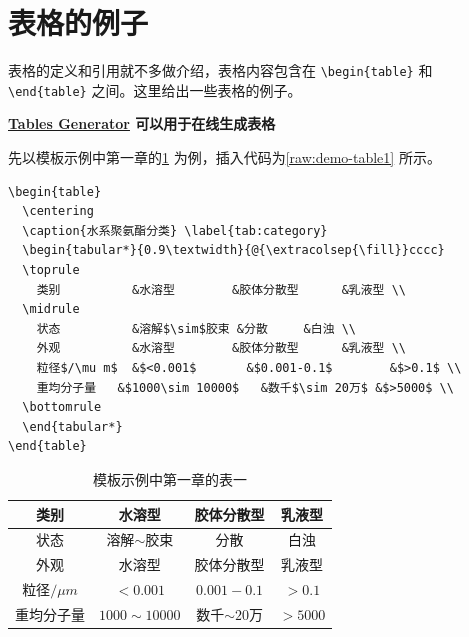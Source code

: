 \section{表格的例子}
\label{sec:tab}

表格的定义和引用就不多做介绍，表格内容包含在 \verb+\begin{table}+ 和 \verb+\end{table}+ 之间。这里给出一些表格的例子。

\textbf{\href{https://www.tablesgenerator.com/}{Tables Generator} 可以用于在线生成表格}

先以模板示例中第一章的\cref{tab:category} 为例，插入代码为\cref{raw:demo-table1} 所示。

\begin{lstlisting}[language={[LaTeX]TeX}, caption={示例插表代码}, label=raw:demo-table1]
\begin{table}
  \centering
  \caption{水系聚氨酯分类} \label{tab:category}
  \begin{tabular*}{0.9\textwidth}{@{\extracolsep{\fill}}cccc}
  \toprule
    类别			&水溶型		&胶体分散型		&乳液型 \\
  \midrule
    状态			&溶解$\sim$胶束	&分散		&白浊 \\
    外观			&水溶型		&胶体分散型		&乳液型 \\
    粒径$/\mu m$	&$<0.001$		&$0.001-0.1$		&$>0.1$ \\
    重均分子量	&$1000\sim 10000$	&数千$\sim 20万$ &$>5000$ \\
  \bottomrule
  \end{tabular*}
\end{table}
\end{lstlisting}

\begin{table}
  \centering
  \caption{模板示例中第一章的表一} \label{tab:category}
  \begin{tabular*}{0.9\textwidth}{@{\extracolsep{\fill}}cccc}
  \toprule
    类别			&水溶型		&胶体分散型		&乳液型 \\
  \midrule
    状态			&溶解$\sim$胶束	&分散		&白浊 \\
    外观			&水溶型		&胶体分散型		&乳液型 \\
    粒径$/\mu m$	&$<0.001$		&$0.001-0.1$		&$>0.1$ \\
    重均分子量	&$1000\sim 10000$	&数千$\sim 20$万 &$>5000$ \\
  \bottomrule
  \end{tabular*}
\end{table}

